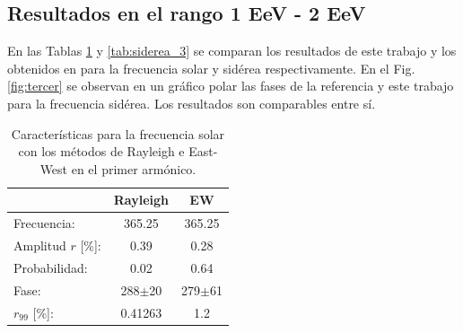 \subsection*{Resultados en el rango 1 EeV - 2 EeV}

 
En las Tablas \ref{tab:solar_3} y \ref{tab:siderea_3} se comparan los resultados de este trabajo y los obtenidos en \cite{Aab_2020} para la frecuencia solar y sidérea respectivamente. En el Fig.\ref{fig:tercer} se observan en un gráfico polar las fases de la referencia y este trabajo para la frecuencia sidérea. Los resultados son comparables entre sí.
    
    \begin{table}[H]
        \begin{small}
            \begin{center}
                \begin{tabular}[c]{l|c|c}
                                    & Rayleigh      & EW            \\\hline
                    Frecuencia:     & 365.25	    & 365.25        \\
                    Amplitud $r$  [\%]:  & 0.39          & 0.28       \\
                    Probabilidad:   & 0.02          & 0.64          \\
                    Fase:           & 288$\pm$20    & 279$\pm$61    \\
                    $r_{99}$ [\%]:       & 0.41263       & 1.2       \\
                \end{tabular}
            \end{center}
        \end{small}
        \caption{Características para la frecuencia solar con los métodos de Rayleigh  e East-West en el primer armónico.}
        \label{tab:solar_3}
    \end{table}

